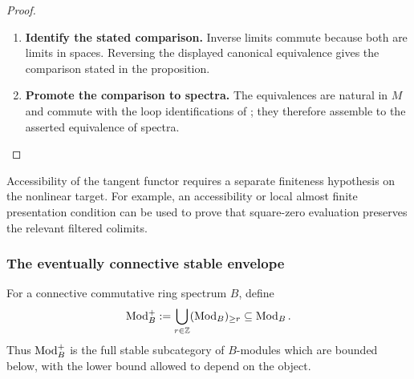 \begin{proof}
\begin{enumerate}[label=\textup{(\arabic*)}]
\[\begin{aligned}
        \varprojlim\nolimits_k
        \mathsf T^n_{Y/V,u}(\tau_{\leq k}M)
        &\simeq
        \varprojlim\nolimits_k\varprojlim\nolimits_d
        \Phi_d(\tau_{\leq k}M)
        \\
        &\simeq
        \varprojlim\nolimits_d\varprojlim\nolimits_k
        \Phi_d(\tau_{\leq k}M)
        \\
        &\simeq
        \varprojlim\nolimits_d\Phi_d(M)
        \\
        &\simeq
        \mathsf T^n_{Y/V,u}(M).
    \end{aligned}
    \]
    \item \textbf{Identify the stated comparison.}
    Inverse limits commute because both are limits in spaces. Reversing the
    displayed canonical equivalence gives the comparison stated in the
    proposition.
    \item \textbf{Promote the comparison to spectra.}
    The equivalences are natural in \(M\) and commute with the loop
    identifications of ; they therefore
    assemble to the asserted equivalence of spectra.
\end{enumerate}
\end{proof}


\begin{remark}
\label{rem:tangent-accessibility-separate}
Accessibility of the tangent functor requires a separate finiteness
hypothesis on the nonlinear target. For example, an accessibility or
local almost finite presentation condition can be used to prove that
square-zero evaluation preserves the relevant filtered colimits.
\end{remark}

\subsubsection{The eventually connective stable envelope}

\begin{definition}
\label{def:eventually-connective-coefficients}
For a connective commutative ring spectrum \(B\), define
\[
    \operatorname{Mod}_B^{+}
    :=
    \bigcup_{r\in\mathbb Z}(\operatorname{Mod}_B)_{\geq r}
    \subseteq
    \operatorname{Mod}_B.
\]
Thus \(\operatorname{Mod}_B^{+}\) is the full stable subcategory of \(B\)-modules which are
bounded below, with the lower bound allowed to depend on the object.
\end{definition}

